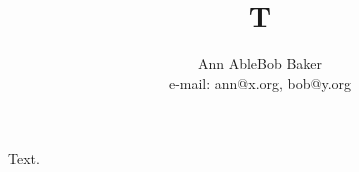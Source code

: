 \documentclass{article}
\begin{document}
\title{T}
\author{Ann Able\quad Bob Baker\\ e-mail: ann@x.org, \quad bob@y.org}
\maketitle
Text.
\end{document}
